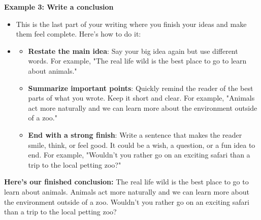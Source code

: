\documentclass[12pt]{article}
\begin{document}
\begin{tcolorbox}[colframe=black!60, colback=white, 
coltitle=black, colbacktitle=black!15, fonttitle=\bfseries\Large, 
title=Examples, halign title=center, left=10pt, right=10pt, top=10pt, bottom=15pt]

\textbf{Example 3: Write a conclusion}
\begin{itemize}
    \item This is the last part of your writing where you finish your ideas and make them feel complete. Here’s how to do it:
    \item
    \begin{itemize}
        \item \textbf{Restate the main idea}: Say your big idea again but use different words. For example, "The real life wild is the best place to go to learn about animals."
    \item \textbf{Summarize important points}: Quickly remind the reader of the best parts of what you wrote. Keep it short and clear. For example, "Animals act more naturally and we can learn more about the environment outside of a zoo."
    \item \textbf{End with a strong finish}: Write a sentence that makes the reader smile, think, or feel good. It could be a wish, a question, or a fun idea to end. For example, "Wouldn't you rather go on an exciting safari than a trip to the local petting zoo?"

\end{itemize}
 
\end{itemize}
 
\textbf{Here's our finished conclusion: }The real life wild is the best place to go to learn about animals. Animals act more naturally and we can learn more about the environment outside of a zoo. Wouldn't you rather go on an exciting safari than a trip to the local petting zoo?




     \end{tcolorbox}
\end{document}
